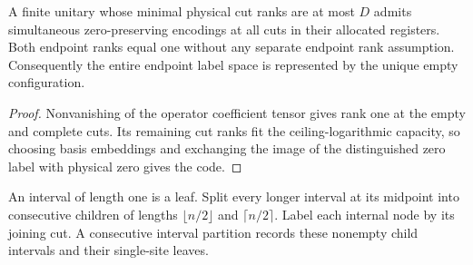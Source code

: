 \begin{lemma}
    \label{thm:mpu_endpoint_bond_encodings}
    \leanok
    A finite unitary whose minimal physical cut ranks are at most
    $D$ admits simultaneous zero-preserving encodings at all cuts
    in their allocated registers. Both endpoint ranks equal one without
    any separate endpoint rank assumption.
    Consequently the entire endpoint label space is represented by
    the unique empty configuration.
\end{lemma}
\begin{proof}\leanok
    Nonvanishing of the operator coefficient tensor gives rank one
    at the empty and complete cuts. Its remaining cut ranks fit the
    ceiling-logarithmic capacity, so choosing basis embeddings and exchanging
    the image of the distinguished zero label with physical zero gives the code.
\end{proof}

\begin{definition}
    \label{def:mpu_balanced_interval_tree}
    \leanok
    An interval of length one is a leaf. Split every longer interval
    at its midpoint into consecutive children of lengths
    $\lfloor n/2\rfloor$ and $\lceil n/2\rceil$. Label each internal
    node by its joining cut. A consecutive interval partition
    records these nonempty child intervals and their single-site leaves.
\end{definition}

